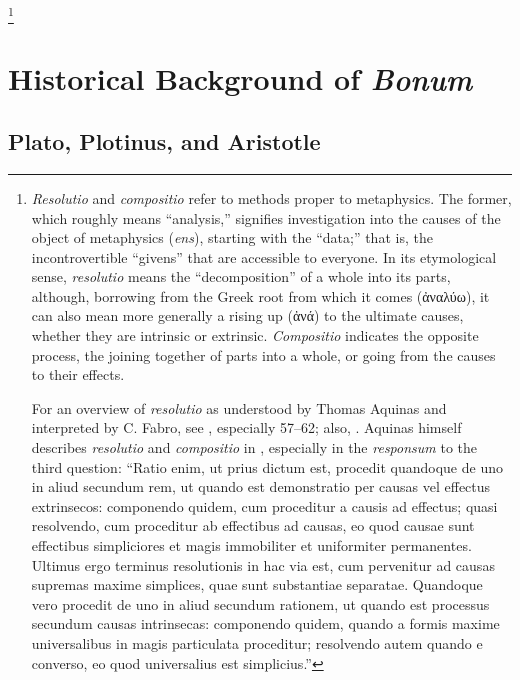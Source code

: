 \footnote{\emph{Resolutio} and \emph{compositio} refer to methods proper to metaphysics. The former, which roughly means “analysis,” signifies investigation into the causes of the object of metaphysics (\emph{ens}), starting with the “data;” that is, the incontrovertible “givens” that are accessible to everyone. In its etymological sense, \emph{resolutio} means the “decomposition” of a whole into its parts, although, borrowing from the Greek root from which it comes (ἀναλύω), it can also mean more generally a rising up (ἀνά) to the ultimate causes, whether they are intrinsic or extrinsic.  \emph{Compositio} indicates the opposite process, the joining together of parts into a whole, or going from the causes to their effects.

For an overview of \emph{resolutio} as understood by Thomas Aquinas and interpreted by C. Fabro, see \cite{villagrasa:resolutio}, especially 57–62; also, \cite[339–359]{mitchell:resolutio}. Aquinas himself describes \emph{resolutio} and \emph{compositio} in \cite[q.~6, a.~1]{st:detrinitate}, especially in the \emph{responsum} to the third question: “Ratio enim, ut prius dictum est, procedit quandoque de uno in aliud secundum rem, ut quando est demonstratio per causas vel effectus extrinsecos: componendo quidem, cum proceditur a causis ad effectus; quasi resolvendo, cum proceditur ab effectibus ad causas, eo quod causae sunt effectibus simpliciores et magis immobiliter et uniformiter permanentes. Ultimus ergo terminus resolutionis in hac via est, cum pervenitur ad causas supremas maxime simplices, quae sunt substantiae separatae. Quandoque vero procedit de uno in aliud secundum rationem, ut quando est processus secundum causas intrinsecas: componendo quidem, quando a formis maxime universalibus in magis particulata proceditur; resolvendo autem quando e converso, eo quod universalius est simplicius.”}
%

\section{Historical Background of \emph{Bonum}}
\subsection{Plato, Plotinus, and Aristotle}


